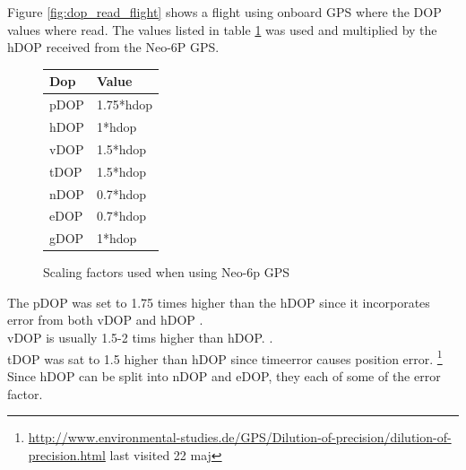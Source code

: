 \newpage
Figure \ref{fig:dop_read_flight} shows a flight using onboard GPS where the DOP values where read. The values listed in table \ref{tab:DOP} was used and multiplied by the hDOP received from the Neo-6P GPS. 
\begin{figure}
 \begin{center}
	\caption{Scaling factors used when using Neo-6p GPS}
	\label{tab:DOP}
	\begin{tabular}{@{}|l|l|@{}}
	\toprule
	Dop  & Value     \\ \midrule
	pDOP & 1.75*hdop \\ \midrule
	hDOP & 1*hdop    \\ \midrule
	vDOP & 1.5*hdop  \\ \midrule
	tDOP & 1.5*hdop  \\ \midrule
	nDOP & 0.7*hdop  \\ \midrule
	eDOP & 0.7*hdop  \\ \midrule
	gDOP & 1*hdop    \\ \bottomrule
	\end{tabular}
  \end{center}
\end{figure}

The pDOP was set to 1.75 times higher than the hDOP since it incorporates error from both vDOP and hDOP \cite{kelddueholmmikkellaurentziusannab.o.jensen2015}. \\
vDOP is usually 1.5-2 tims higher than hDOP.  \cite{kelddueholmmikkellaurentziusannab.o.jensen2015}. \\
tDOP was sat to 1.5 higher than hDOP since timeerror causes position error. \footnote{\url{http://www.environmental-studies.de/GPS/Dilution-of-precision/dilution-of-precision.html} last visited 22 maj} \\
Since hDOP can be split into nDOP and eDOP, they each of some of the error factor. \\
 \cite{kelddueholmmikkellaurentziusannab.o.jensen2015}




